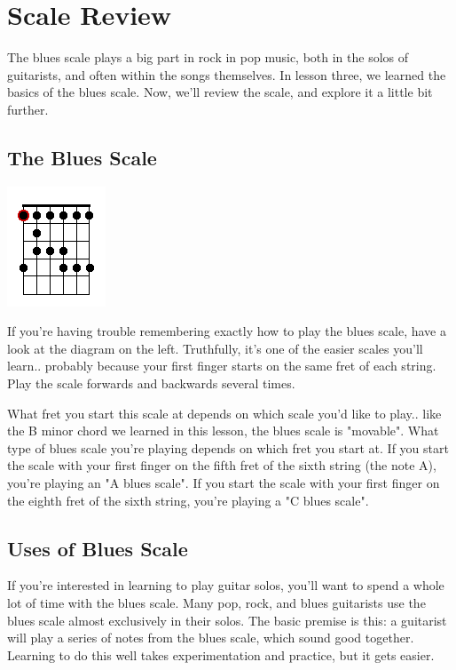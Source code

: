 \section{Scale Review}
The blues scale plays a big part in rock in pop music, both in the solos of guitarists, and often within the songs themselves. In lesson three, we learned the basics of the blues scale. Now, we'll review the scale, and explore it a little bit further. 

\subsection{The Blues Scale}
\includegraphics{partfive/bluesscale2.png}

If you're having trouble remembering exactly how to play the blues scale, have a look at the diagram on the left. Truthfully, it's one of the easier scales you'll learn.. probably because your first finger starts on the same fret of each string. Play the scale forwards and backwards several times.

What fret you start this scale at depends on which scale you'd like to play.. like the B minor chord we learned in this lesson, the blues scale is "movable". What type of blues scale you're playing depends on which fret you start at. If you start the scale with your first finger on the fifth fret of the sixth string (the note A), you're playing an "A blues scale". If you start the scale with your first finger on the eighth fret of the sixth string, you're playing a "C blues scale". 

\subsection{Uses of Blues Scale}
If you're interested in learning to play guitar solos, you'll want to spend a whole lot of time with the blues scale. Many pop, rock, and blues guitarists use the blues scale almost exclusively in their solos. The basic premise is this: a guitarist will play a series of notes from the blues scale, which sound good together. Learning to do this well takes experimentation and practice, but it gets easier.

